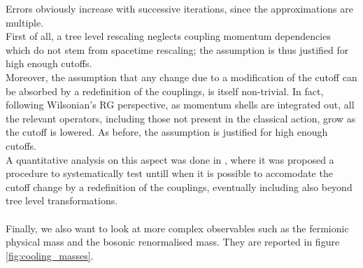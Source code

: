 Errors obviously increase with successive iterations, since the approximations are multiple. \\
First of all, a tree level rescaling neglects coupling momentum dependencies which do not stem from spacetime rescaling; the assumption is thus justified for high enough cutoffs.  \\
Moreover, the assumption that any change due to a modification of the cutoff can be absorbed by a redefinition of the couplings, is itself non-trivial. In fact, following Wilsonian's RG perspective, as momentum shells are integrated out, 
all the relevant operators, including those not present in the classical action, grow as the cutoff is lowered. As before, the assumption is justified for high enough cutoffs. \\
A quantitative analysis on this aspect was done in \cite{Pawlowski2017CoolingNoise}, where it was proposed a procedure to 
systematically test untill when it is possible to accomodate the cutoff change by a redefinition of the couplings, eventually including also beyond tree level transformations. \\~\\
Finally, we also want to look at more complex observables such as the fermionic physical mass and the bosonic renormalised mass. They are reported in figure \ref{fig:cooling_masses}. 
